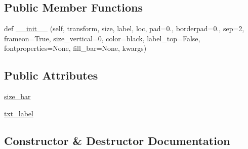 \subsection*{Public Member Functions}
\begin{DoxyCompactItemize}
\item 
def \hyperlink{classaxes__grid1_1_1anchored__artists_1_1AnchoredSizeBar_a82d68d202c57827b3c49e7c8761b0922}{\+\_\+\+\_\+init\+\_\+\+\_\+} (self, transform, size, label, loc, pad=0., borderpad=0., sep=2, frameon=True, size\+\_\+vertical=0, color=\textquotesingle{}black\textquotesingle{}, label\+\_\+top=False, fontproperties=None, fill\+\_\+bar=None, kwargs)
\end{DoxyCompactItemize}
\subsection*{Public Attributes}
\begin{DoxyCompactItemize}
\item 
\hyperlink{classaxes__grid1_1_1anchored__artists_1_1AnchoredSizeBar_a39070142bc27121b01115ced472df035}{size\+\_\+bar}
\item 
\hyperlink{classaxes__grid1_1_1anchored__artists_1_1AnchoredSizeBar_a7debb95f72c21abf57883b2e6e913510}{txt\+\_\+label}
\end{DoxyCompactItemize}


\subsection{Constructor \& Destructor Documentation}
\mbox{\label{classaxes__grid1_1_1anchored__artists_1_1AnchoredSizeBar_a82d68d202c57827b3c49e7c8761b0922}} 
